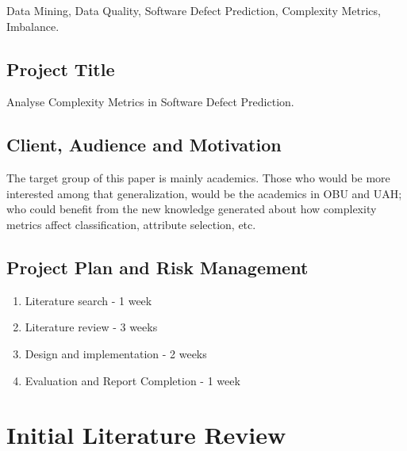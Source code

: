 \documentclass{article}
\begin{document}
Data Mining, Data Quality, Software Defect Prediction, Complexity Metrics, 
Imbalance.

\subsection{Project Title}

Analyse Complexity Metrics in Software Defect Prediction.

\subsection{Client, Audience and Motivation}

The target group of this paper is mainly academics. Those who would be more
interested among that generalization, would be the academics in OBU and UAH; who
could benefit from the new knowledge generated about how complexity metrics
affect classification, attribute selection, etc.

\subsection{Project Plan and Risk Management}

\begin{enumerate}

\item Literature search - 1 week
\item Literature review - 3 weeks
\item Design and implementation - 2 weeks
\item Evaluation and Report Completion - 1 week

\end{enumerate}


\section{Initial Literature Review}
\end{document}
